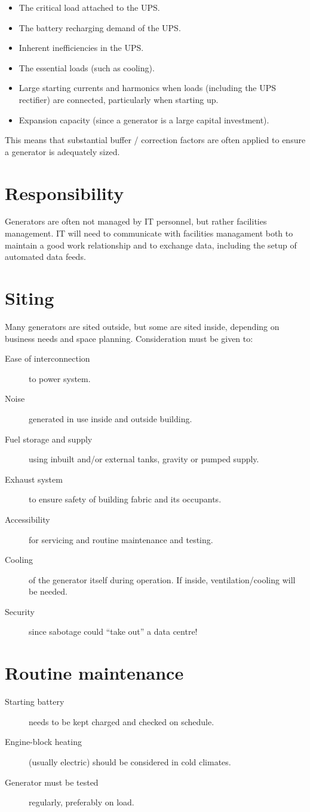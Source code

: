 \documentclass{pgnotes}
\begin{document}
\begin{itemize}
\item The critical load attached to the UPS.
\item The battery recharging demand of the UPS.
\item Inherent inefficiencies in the UPS.
\item The essential loads (such as cooling).
\item Large starting currents and harmonics when loads (including the UPS rectifier) are connected, particularly when starting up.
\item Expansion capacity (since a generator is a large capital investment).
\end{itemize}

This means that substantial buffer / correction factors are often applied to ensure a generator is adequately sized.

\section{Responsibility}

Generators are often not managed by IT personnel, but rather facilities management.
IT will need to communicate with facilities managament both to maintain a good work relationship and to exchange data, including the setup of automated data feeds.


\section{Siting}

Many generators are sited outside, but some are sited inside, depending on business needs and space planning.
Consideration must be given to:
\begin{description}
\item[Ease of interconnection] to power system.
\item[Noise] generated in use inside and outside building.
\item[Fuel storage and supply] using inbuilt and/or external tanks, gravity or pumped supply.
\item[Exhaust system] to ensure safety of building fabric and its occupants.
\item[Accessibility] for servicing and routine maintenance and testing.
\item[Cooling] of the generator itself during operation.  If inside, ventilation/cooling will be needed.
\item[Security] since sabotage could ``take out'' a data centre!
\end{description}

\section{Routine maintenance}

\begin{description}
\item[Starting battery] needs to be kept charged and checked on schedule.
\item[Engine-block heating] (usually electric) should be considered in cold climates.
\item[Generator must be tested] regularly, preferably on load.
\end{description}
\end{document}
